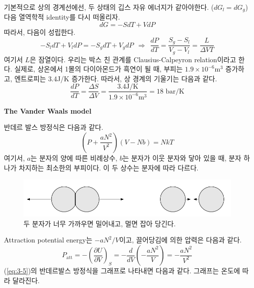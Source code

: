 \documentclass{article}
\begin{document}
기본적으로 상의 경계선에선, 두 상태의 깁스 자유 에너지가 같아야한다. ($dG_l = dG_g$) 다음 열역학적 identity를 다시 떠올리자.
\begin{equation}
    dG = -SdT + VdP
\end{equation} 
따라서, 다음이 성립한다.
\begin{equation}
    -S_{l} dT + V_l dP = -S_g dT  + V_g dP \ \ \Rightarrow \ \ \boxed{\frac{dP}{dT} = \frac{S_g - S_l}{V_g - V_l} = \frac{L}{\Delta V T}}
\end{equation}
여기서 $L$은 잠열이다. 우리는 박스 친 관계를 Clausius-Calpeyron relation이라고 한다. 실제로, 상온에서 1몰의 다이아몬드가 흑연이 될 때, 부피는 $1.9 \times 10^{-6}$m$^{3}$ 증가하고, 엔트로피는 3.4J/K 증가한다. 따라서,  상 경계의 기울기는 다음과 같다.
\begin{equation}
    \frac{dP}{dT} = \frac{\Delta S}{\Delta V} = \frac{3.4 \text{J/K}}{1.9 \times 10^{-6}\text{m}^3} = 18 \text{ bar/K}
\end{equation}

\noindent
\textbf{The Vander Waals model}

반데르 발스 방정식은 다음과 같다.
\begin{equation}\label{eq:3-5}
    \left( P + \frac{aN^2}{V^2} \right)(V-Nb) = NkT
\end{equation}
여기서, $a$는 분자의 양에 따른 비례상수, $b$는 분자가 이웃 분자와 닿아 있을 때, 분자 하나가 차지하는 최소한의 부피이다. 이 두 상수는 분자에 따라 다르다.

\begin{figure}[h]
    \centering
    \includegraphics[width=0.7\linewidth]{images/fig3_6.png}
    \caption{두 분자가 너무 가까우면 밀어내고, 멀면 잡아 당긴다.}
\end{figure}

\newpage

Attraction potential energy는 $-aN^2/V$이고, 끌어당김에 의한 압력은 다음과 같다.
\begin{equation}
    P_{\text{att}} = - \left( \frac{\partial U}{\partial V} \right)_S = -\frac{d}{dV} \left(- \frac{aN^2}{V} \right) = - \frac{aN^2}{V^2}
\end{equation}
(\ref{eq:3-5})의 반데르발스 방정식을 그래프로 나타내면 다음과 같다. 그래프는 온도에 따라 달라진다.
\end{document}
